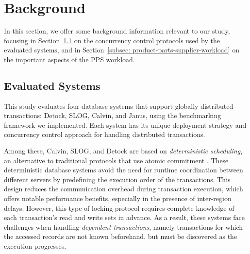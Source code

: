 \section{Background}
\label{sec: background}
In this section, we offer some background information relevant to our study, focusing in Section~\ref{subsec: evaluated-systems} on the concurrency control protocols used by the evaluated systems, and in Section~\ref{subsec: product-parts-supplier-workload} on the important aspects of the PPS workload. 

\subsection{Evaluated Systems}
\label{subsec: evaluated-systems}
This study evaluates four database systems that support globally distributed transactions: Detock, SLOG, Calvin, and Janus, using the benchmarking framework we implemented. Each system has its unique deployment strategy and concurrency control approach for handling distributed transactions.

Among these, Calvin, SLOG, and Detock are based on \textit{deterministic scheduling}, an alternative to traditional protocols that use atomic commitment \cite{thomson2010case}. These deterministic database systems avoid the need for runtime coordination between different servers by predefining the execution order of the transactions. This design reduces the communication overhead during transaction execution, which offers notable performance benefits, especially in the presence of inter-region delays. However, this type of locking protocol requires complete knowledge of each transaction's read and write sets in advance. As a result, these systems face challenges when handling \textit{dependent transactions}, namely transactions for which the accessed records are not known beforehand, but must be discovered as the execution progresses.

